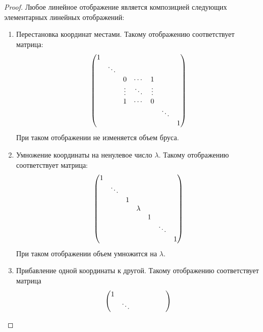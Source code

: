 \begin{proof}
    Любое линейное отображение является композицией следующих элементарных линейных отображений:
    \begin{enumerate}
        \item Перестановка координат местами. Такому отображению соответствует матрица:
        \[
        \begin{pmatrix}
        1      & \null & \null & \null & \null & \null & \null \\
        \null & \ddots & \null & \null & \null & \null & \null \\
        \null & \null & 0 & \cdots & 1      & \null & \null \\
        \null & \null & \vdots & \ddots & \vdots & \null & \null \\
        \null & \null & 1      & \cdots & 0 & \null & \null \\
        \null & \null & \null & \null & \null & \ddots & \null \\
        \null & \null & \null & \null & \null & \null & 1
        \end{pmatrix}
        \]
        При таком отображении не изменяется объем бруса.
        \item Умножение координаты на ненулевое число $\lambda$. Такому отображению соответствует матрица:
        \[
        \begin{pmatrix}
        1      & \null & \null & \null & \null & \null & \null \\
        \null & \ddots & \null & \null & \null & \null & \null \\
        \null & \null & 1      & \null & \null & \null & \null \\
        \null & \null & \null & \lambda & \null & \null & \null \\
        \null & \null & \null & \null & 1      & \null & \null \\
        \null & \null & \null & \null & \null & \ddots & \null \\
        \null & \null & \null & \null & \null & \null & 1
        \end{pmatrix}
        \]
        При таком отображении объем умножится на $\lambda$.
        \item Прибавление одной координаты к другой. Такому отображению соответствует матрица
        \[
        \begin{pmatrix}
        1 & \null & \null & \null & \null & \null & \null \\
        \null & \ddots & \null & \null & \null & \null & \null \\

\end{pmatrix}\]
\end{enumerate}
\end{proof}
